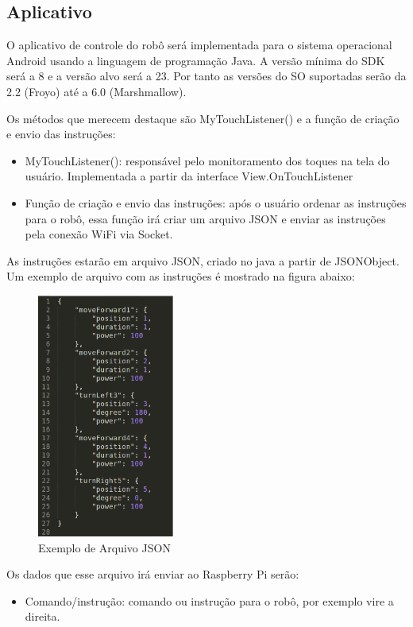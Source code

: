 \subsection{Aplicativo}

O aplicativo de controle do robô será implementada para o sistema operacional Android usando a linguagem de programação Java. A versão mínima do SDK será a 8 e a versão alvo será a 23. Por tanto as versões do SO suportadas serão da 2.2 (Froyo) até a 6.0 (Marshmallow).

Os métodos que merecem destaque são MyTouchListener() e a função de criação e envio das instruções:
\begin{itemize}
\item MyTouchListener(): responsável pelo monitoramento dos toques na tela do usuário. Implementada a partir da interface View.OnTouchListener
\item Função de criação e envio das instruções: após o usuário ordenar as instruções para o robô, essa função irá criar um arquivo JSON e enviar as instruções pela conexão WiFi via Socket.
\end{itemize}

As instruções estarão em arquivo JSON, criado no java a partir de JSONObject. Um exemplo de arquivo com as instruções é mostrado na figura abaixo:

\begin{figure}[H]
    \centering
    \includegraphics[width=0.4\textwidth]{figuras/exemplo_json.eps}
    \caption{Exemplo de Arquivo JSON}
    \label{fig:exemplo_json}
\end{figure}

Os dados que esse arquivo irá enviar ao Raspberry Pi serão:
\begin{itemize}
	\item Comando/instrução: comando ou instrução para o robô, por exemplo vire a direita.
\end{itemize}

